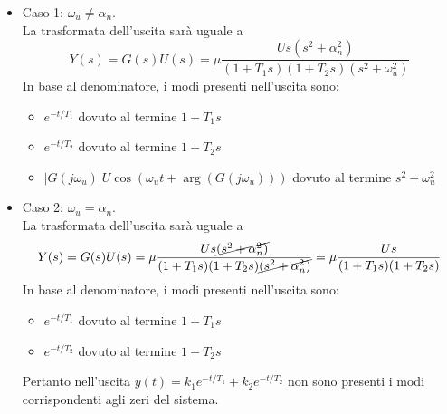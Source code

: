 \documentclass{article}
\numberwithin{equation}{subsection}
\begin{document}
\begin{itemize}
    \item Caso 1: $\omega_u \neq \alpha_n$.\\
    La trasformata dell'uscita sarà uguale a
    \[
        Y(s) = G(s) U(s) = \mu \frac{U s (s^2+\alpha_n^2)}{(1+T_1 s)(1+T_2 s)(s^2 + \omega_u^2)} 
    \]
    In base al denominatore, i modi presenti nell'uscita sono:
    \begin{itemize}
        \item $e^{-t/T_1}$ dovuto al termine $1+T_1 s$
        \item $e^{-t/T_2}$ dovuto al termine $1+T_2 s$
        \item $|G(j \omega_u)|U \cos(\omega_u t + \arg(G(j\omega_u)))$ dovuto al termine $s^2+\omega_u^2$
    \end{itemize}

    \item Caso 2: $\omega_u = \alpha_n$.\\
    La trasformata dell'uscita sarà uguale a
    \[
        Y(s) = G(s) U(s) = \mu \frac{U s \cancel{(s^2+\alpha_n^2)}}{(1+T_1 s)(1+T_2 s)\cancel{(s^2 + \alpha_n^2)}} = \mu \frac{U s}{(1+T_1 s)(1+T_2 s)}
    \]
    In base al denominatore, i modi presenti nell'uscita sono:
    \begin{itemize}
        \item $e^{-t/T_1}$ dovuto al termine $1+T_1 s$
        \item $e^{-t/T_2}$ dovuto al termine $1+T_2 s$
    \end{itemize}
    Pertanto nell'uscita $y(t) = k_1 e^{-t/T_1} + k_2 e^{-t/T_2}$ non sono presenti i modi corrispondenti agli zeri del sistema.
\end{itemize}
\end{document}
